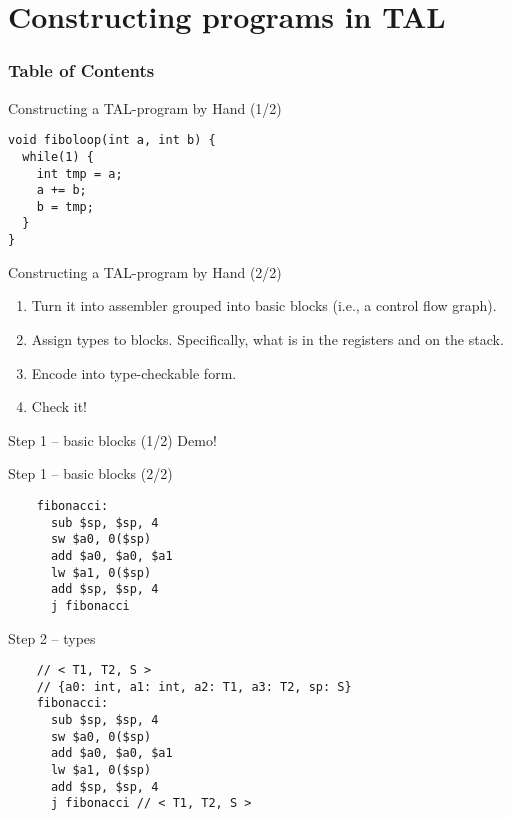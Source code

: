 \section{Constructing programs in TAL}
\begin{frame}
\frametitle{Table of Contents}
\tableofcontents[currentsection]
\end{frame}

\begin{frame}[fragile]{Constructing a TAL-program by Hand (1/2)}
\begin{lstlisting}
void fiboloop(int a, int b) {
  while(1) {
    int tmp = a;
    a += b;
    b = tmp;
  }
}
\end{lstlisting}
\end{frame}

\begin{frame}{Constructing a TAL-program by Hand (2/2)}
  \begin{enumerate}
  \item Turn it into assembler grouped into basic blocks (i.e., a control flow
    graph).
  \item Assign types to blocks. Specifically, what is in the registers and on
    the stack.
  \item Encode into type-checkable form.
  \item Check it!
  \end{enumerate}
\end{frame}

\begin{frame}[fragile]{Step 1 -- basic blocks (1/2)}
  Demo!
\end{frame}

\begin{frame}[fragile]{Step 1 -- basic blocks (2/2)}
  \begin{lstlisting}
    fibonacci:
      sub $sp, $sp, 4
      sw $a0, 0($sp)
      add $a0, $a0, $a1
      lw $a1, 0($sp)
      add $sp, $sp, 4
      j fibonacci
  \end{lstlisting}
\end{frame}

\begin{frame}[fragile]{Step 2 -- types}
  \begin{lstlisting}
    // < T1, T2, S >
    // {a0: int, a1: int, a2: T1, a3: T2, sp: S}
    fibonacci:
      sub $sp, $sp, 4
      sw $a0, 0($sp)
      add $a0, $a0, $a1
      lw $a1, 0($sp)
      add $sp, $sp, 4
      j fibonacci // < T1, T2, S >
  \end{lstlisting}
\end{frame}

